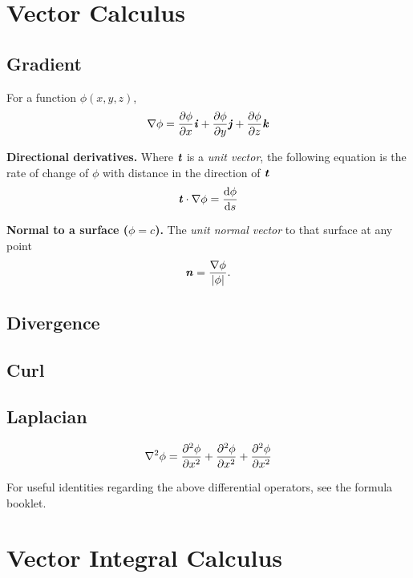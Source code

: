 \section{Vector Calculus}

\subsection*{Gradient}
For a function $\phi(x, y, z)$,
\begin{equation*}
    \nabla \phi = \pdv{\phi}{x} \textbf{\textit{i}} + \pdv{\phi}{y} \textbf{\textit{j}} + \pdv{\phi}{z} \textbf{\textit{k}}
\end{equation*}

\textbf{Directional derivatives.} Where $\textbf{\textit{t}}$ is a \textit{unit vector},
the following equation is the rate of change of $\phi$ with distance in the direction of $\textbf{\textit{t}}$
\begin{equation*}
    \textbf{\textit{t}} \cdot \nabla \phi = \odv{\phi}{s}
\end{equation*}

\textbf{Normal to a surface ($\phi = c$).} The \textit{unit normal vector} to that surface at any point
\begin{equation*}
    \textbf{\textit{n}} = \frac{\nabla \phi}{|\phi|}.
\end{equation*}

\subsection*{Divergence}

\subsection*{Curl}

\subsection*{Laplacian}
\begin{equation*}
    \nabla^2 \phi =  \pdv[order=2]{\phi}{x} + \pdv[order=2]{\phi}{x} + \pdv[order=2]{\phi}{x}
\end{equation*}

For useful identities regarding the above differential operators, see the formula booklet.

\section{Vector Integral Calculus}


